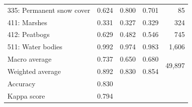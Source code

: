 \begin{table}[!hbt]
\begin{tabular}{@{}lrrrr@{}}
        335: Permanent snow cover      & 0.624                             & 0.800                         & 0.701                        & 85                      \\
        411: Marshes                   & 0.331                             & 0.327                         & 0.329                        & 324                     \\
        412: Peatbogs                  & 0.629                             & 0.482                         & 0.546                        & 745                     \\
        511: Water bodies              & 0.992                             & 0.974                         & 0.983                        & 1,606                    \\
        \midrule
        Macro average                   & 0.737                             & 0.650                         & 0.680                        & \multirow{2}{*}{49,897}      \\
        Weighted average                & 0.892                             & 0.830                         & 0.854                        &                             \\
        \midrule
        Accuracy                        & 0.830                             & \multicolumn{1}{l}{}          & \multicolumn{1}{l}{}         & \multicolumn{1}{l}{}        \\
        Kappa score                     & 0.794                             & \multicolumn{1}{l}{}          & \multicolumn{1}{l}{}         & \multicolumn{1}{l}{}        \\ 
        \bottomrule
        \end{tabular}
        \end{table}
        
